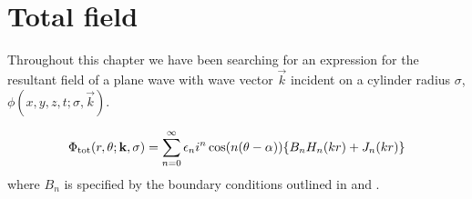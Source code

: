 \section{Total field}
Throughout this chapter we have been searching for an expression for the resultant field of a plane wave with wave vector $\vec{k}$ incident on a cylinder radius $\sigma$, $\phi(x,y,z,t;\sigma, \vec{k})$.\par
%
    \begin{propn}
        \begin{equation*}
            \Phi_{\text{tot}} (r, \theta; \mathbf{k}, \sigma) =
            \sum^\infty_{n=0} \epsilon_n i^n \cos(n(\theta-\alpha))
             \{B_n H_n(kr) + J_n(kr)\}
        \end{equation*}
      where $B_n$ is specified by the boundary conditions outlined in  and .
    \end{propn}
